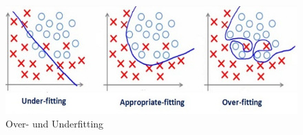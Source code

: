 \documentclass[12pt,oneside,a4paper,parskip]{scrbook}
\begin{document}
\begin{figure}[h]
	\begin{center}
		\includegraphics[width=12cm]{Bilder/overUnderfitting.png}
		\caption{Over- und Underfitting\cite{overUnderfitting}}
		\label{fig:overUnderFitting}
	\end{center}
\end{figure}
\end{document}
